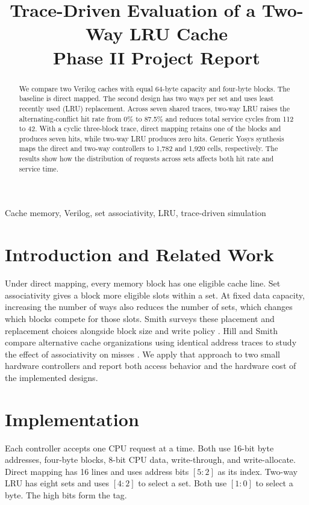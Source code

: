 
\title{Trace-Driven Evaluation of a Two-Way LRU Cache\\
\large Phase II Project Report}

\maketitle

\begin{abstract}
We compare two Verilog caches with equal 64-byte capacity and four-byte
blocks. The baseline is direct mapped. The second design has two ways per
set and uses least recently used (LRU) replacement. Across seven shared
traces, two-way LRU raises the alternating-conflict hit rate from 0\% to
87.5\% and reduces total service cycles from 112 to 42. With a cyclic
three-block trace, direct mapping retains one of the blocks and produces
seven hits, while two-way LRU produces zero hits. Generic Yosys synthesis
maps the direct and two-way controllers to 1,782 and 1,920 cells,
respectively. The results show how the distribution of requests across
sets affects both hit rate and service time.
\end{abstract}

\begin{IEEEkeywords}
Cache memory, Verilog, set associativity, LRU, trace-driven simulation
\end{IEEEkeywords}

\section{Introduction and Related Work}
Under direct mapping, every memory block has one eligible cache line.
Set associativity gives a block more eligible slots within a set. At fixed
data capacity, increasing the number of ways also reduces the number of
sets, which changes which blocks compete for those slots. Smith surveys
these placement and replacement choices alongside block size and write
policy \cite{smith}. Hill and Smith compare alternative cache organizations
using identical address traces to study the effect of associativity
on misses \cite{hill}. We apply that approach to two small hardware
controllers and report both access behavior and the hardware cost of the
implemented designs.

\section{Implementation}
Each controller accepts one CPU request at a time. Both use 16-bit byte
addresses, four-byte blocks, 8-bit CPU data, write-through, and
write-allocate. Direct mapping has 16 lines and uses address bits
$[5:2]$ as its index. Two-way LRU has eight sets and uses $[4:2]$ to
select a set. Both use $[1:0]$ to select a byte. The high bits form the tag.

